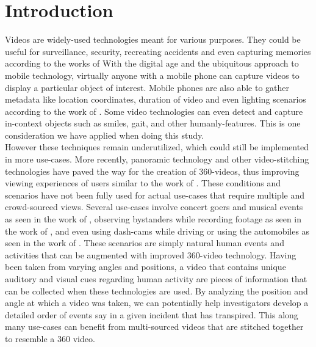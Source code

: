 \documentclass{sigchi}
\begin{document}
\section{Introduction}
Videos are widely-used technologies meant for various purposes. They could be useful for surveillance, security, recreating accidents and even capturing memories according to the works of \cite{zhou2011system, han2012reconstruction, balassanian2014system} With the digital age and the ubiquitous approach to mobile technology, virtually anyone with a mobile phone can capture videos to display a particular object of interest. Mobile phones are also able to gather metadata like location coordinates, duration of video and even lighting scenarios according to the work of \cite{lau2018location}. Some video technologies can even detect and capture in-context objects such as smiles, gait, and other humanly-features. This is one consideration we have applied when doing this study. \\
However these techniques remain underutilized, which could still be implemented in more use-cases. More recently, panoramic technology and other video-stitching technologies have paved the way for the creation of 360-videos, thus improving viewing experiences of users similar to the work of \cite{sula2010system}. These conditions and scenarios have not been fully used for actual use-cases that require multiple and crowd-sourced views. Several use-cases involve concert goers and musical events as seen in the work of \cite{shrestha2010automatic}, observing bystanders while recording footage as seen in the work of \cite{singhal2016you}, and even using dash-cams while driving or using the automobiles as seen in the work of \cite{han2012reconstruction}. These scenarios are simply natural human events and activities that can be augmented with improved 360-video technology. Having been taken from varying angles and positions, a video that contains unique auditory and visual cues regarding human activity are pieces of information that can be collected when these technologies are used. By analyzing the position and angle at which a video was taken, we can potentially help investigators develop a detailed order of events say in a given incident that has transpired. This along many use-cases can benefit from multi-sourced videos that are stitched together to resemble a 360 video. \\
\end{document}
